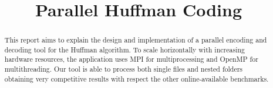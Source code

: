 \documentclass[conference]{IEEEtran}
\begin{document}
\title{Parallel Huffman Coding}

\author{
    \and
}

\maketitle

\thispagestyle{plain}
\pagestyle{plain}

\begin{abstract}
    This report aims to explain the design and implementation of a parallel encoding and decoding tool for the Huffman algorithm.
    To scale horizontally with increasing hardware resources, the application uses MPI for multiprocessing and OpenMP for multithreading.
    Our tool is able to process both single files and nested folders obtaining very competitive results with respect the other online-available benchmarks.
\end{abstract}







{}



\end{document}
